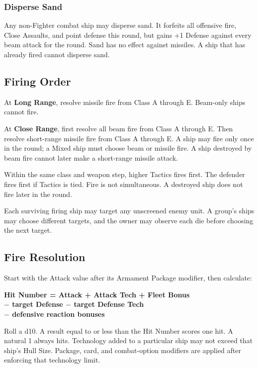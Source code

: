 \subsubsection{Disperse Sand}

Any non-Fighter combat ship may disperse sand. It forfeits all offensive fire,
Close Assaults, and point defense this round, but gains +1 Defense against
every beam attack for the round. Sand has no effect against missiles. A ship
that has already fired cannot disperse sand.

\subsection{Firing Order}

At \textbf{Long Range}, resolve missile fire from Class A through E. Beam-only
ships cannot fire.

At \textbf{Close Range}, first resolve all beam fire from Class A through E.
Then resolve short-range missile fire from Class A through E. A ship may fire
only once in the round; a Mixed ship must choose beam or missile fire. A ship
destroyed by beam fire cannot later make a short-range missile attack.

Within the same class and weapon step, higher Tactics fires first. The defender
fires first if Tactics is tied. Fire is not simultaneous. A destroyed ship does
not fire later in the round.

Each surviving firing ship may target any unscreened enemy unit. A group's
ships may choose different targets, and the owner may observe each die before
choosing the next target.

\subsection{Fire Resolution}

Start with the Attack value after its Armament Package modifier, then
calculate:

\begin{center}
\textbf{Hit Number = Attack + Attack Tech + Fleet Bonus \\
$-$ target Defense $-$ target Defense Tech \\
$-$ defensive reaction bonuses}
\end{center}

Roll a d10. A result equal to or less than the Hit Number scores one hit. A
natural 1 always hits. Technology added to a particular ship may not exceed
that ship's Hull Size. Package, card, and combat-option modifiers are applied
after enforcing that technology limit.

